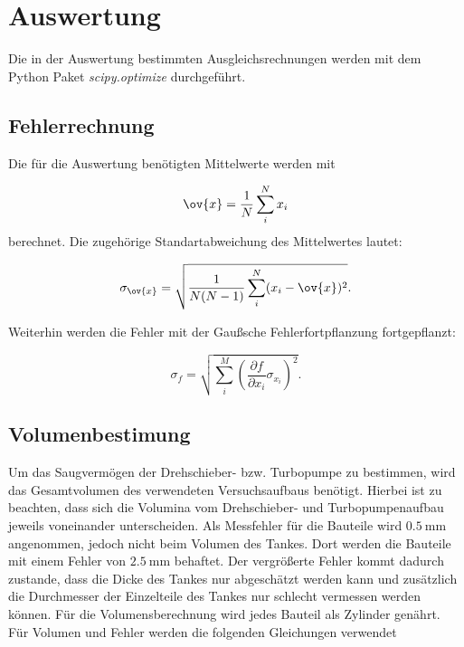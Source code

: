 \section{Auswertung}

Die in der Auswertung bestimmten Ausgleichsrechnungen werden mit
dem Python Paket \emph{scipy.optimize}\cite{scipy} durchgeführt.

\subsection{Fehlerrechnung}

Die für die Auswertung benötigten Mittelwerte werden mit

\begin{equation}
  \label{eq: mittel}
  \ov{x}=\frac{1}{N}\sum_i^N x_i
\end{equation}
berechnet. Die zugehörige Standartabweichung des Mittelwertes lautet:

\begin{equation}
  \label{eq: standartabweichung}
  \sigma_{\ov{x}}=\sqrt{ \frac{1}{N(N-1)} \sum_i^N (x_i-\ov{x})^2}.
\end{equation}

Weiterhin werden die Fehler mit der Gaußsche Fehlerfortpflanzung fortgepflanzt:

\begin{equation}
  \label{eq: gauss_fehler}
  \sigma_f= \sqrt{ \sum_i^M \left(\frac{\partial f}{\partial x_i} \sigma_{x_i}\right)^2}.
\end{equation}

\subsection{Volumenbestimung}

Um das Saugvermögen der Drehschieber- bzw. Turbopumpe zu bestimmen, wird das Gesamtvolumen des verwendeten Versuchsaufbaus benötigt.
Hierbei ist zu beachten, dass sich die Volumina vom Drehschieber- und Turbopumpenaufbau jeweils voneinander unterscheiden.
Als Messfehler für die Bauteile wird $\SI{0.5}{\milli\meter}$ angenommen, jedoch nicht beim Volumen des Tankes. Dort werden die
Bauteile mit einem Fehler von $\SI{2.5}{\milli\meter}$ behaftet. Der vergrößerte Fehler kommt dadurch zustande, dass die
Dicke des Tankes nur abgeschätzt werden kann und zusätzlich die Durchmesser der Einzelteile des Tankes nur schlecht vermessen werden können.
Für die Volumensberechnung wird jedes Bauteil als Zylinder genährt.  Für Volumen und Fehler werden die folgenden Gleichungen verwendet

